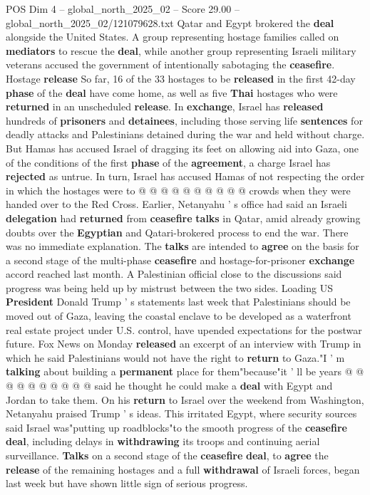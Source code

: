 \begin{textsample}{POS Dim 4 – global\_north\_2025\_02 – Score 29.00 – global\_north\_2025\_02/121079628.txt}
Qatar and Egypt brokered the \textbf{deal} alongside the United States.
A group representing hostage families called on \textbf{mediators} to rescue the \textbf{deal}, while another group representing Israeli military veterans accused the government of intentionally sabotaging the \textbf{ceasefire}.
Hostage \textbf{release} So far, 16 of the 33 hostages to be \textbf{released} in the first 42-day \textbf{phase} of the \textbf{deal} have come home, as well as five \textbf{Thai} hostages who were \textbf{returned} in an unscheduled \textbf{release}.
In \textbf{exchange}, Israel has \textbf{released} hundreds of \textbf{prisoners} and \textbf{detainees}, including those serving life \textbf{sentences} for deadly attacks and Palestinians detained during the war and held without charge.
But Hamas has accused Israel of dragging its feet on allowing aid into Gaza, one of the conditions of the first \textbf{phase} of the \textbf{agreement}, a charge Israel has \textbf{rejected} as untrue.
In turn, Israel has accused Hamas of not respecting the order in which the hostages were to @ @ @ @ @ @ @ @ @ @ crowds when they were handed over to the Red Cross.
Earlier, Netanyahu ' s office had said an Israeli \textbf{delegation} had \textbf{returned} from \textbf{ceasefire} \textbf{talks} in Qatar, amid already growing doubts over the \textbf{Egyptian} and Qatari-brokered process to end the war.
There was no immediate explanation.
The \textbf{talks} are intended to \textbf{agree} on the basis for a second stage of the multi-phase \textbf{ceasefire} and hostage-for-prisoner \textbf{exchange} accord reached last month.
A Palestinian official close to the discussions said progress was being held up by mistrust between the two sides.
Loading US \textbf{President} Donald Trump ' s statements last week that Palestinians should be moved out of Gaza, leaving the coastal enclave to be developed as a waterfront real estate project under U.S. control, have upended expectations for the postwar future.
Fox News on Monday \textbf{released} an excerpt of an interview with Trump in which he said Palestinians would not have the right to \textbf{return} to Gaza."I ' m \textbf{talking} about building a \textbf{permanent} place for them"because"it ' ll be years @ @ @ @ @ @ @ @ @ @ said he thought he could make a \textbf{deal} with Egypt and Jordan to take them.
On his \textbf{return} to Israel over the weekend from Washington, Netanyahu praised Trump ' s ideas.
This irritated Egypt, where security sources said Israel was"putting up roadblocks"to the smooth progress of the \textbf{ceasefire} \textbf{deal}, including delays in \textbf{withdrawing} its troops and continuing aerial surveillance. \textbf{Talks} on a second stage of the \textbf{ceasefire} \textbf{deal}, to \textbf{agree} the \textbf{release} of the remaining hostages and a full \textbf{withdrawal} of Israeli forces, began last week but have shown little sign of serious progress.

\end{textsample}
